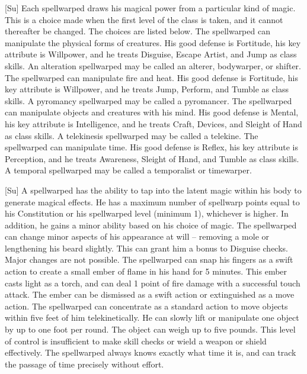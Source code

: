 [Su]
Each spellwarped draws his magical power from a particular kind of magic.
This is a choice made when the first level of the class is taken, and it cannot thereafter be changed.
The choices are listed below.
The spellwarped can manipulate the physical forms of creatures.
His good defense is Fortitude, his key attribute is Willpower, and he treats Disguise, Escape Artist, and Jump as class skills.
An alteration spellwarped may be called an alterer, bodywarper, or shifter.
The spellwarped can manipulate fire and heat.
His good defense is Fortitude, his key attribute is Willpower, and he treats Jump, Perform, and Tumble as class skills.
A pyromancy spellwarped may be called a pyromancer.
The spellwarped can manipulate objects and creatures with his mind.
His good defense is Mental, his key attribute is Intelligence, and he treats Craft, Devices, and Sleight of Hand as class skills.
A telekinesis spellwarped may be called a telekine.
The spellwarped can manipulate time.
His good defense is Reflex, his key attribute is Perception, and he treats Awareness, Sleight of Hand, and Tumble as class skills.
A temporal spellwarped may be called a temporalist or timewarper.

[Su]
A spellwarped has the ability to tap into the latent magic within his body to generate magical effects.
He has a maximum number of spellwarp points equal to his Constitution or his spellwarped level (minimum 1), whichever is higher.
In addition, he gains a minor ability based on his choice of magic.
The spellwarped can change minor aspects of his appearance at will -- removing a mole or lengthening his beard slightly.
This can grant him a  bonus to Disguise checks.
Major changes are not possible.
The spellwarped can snap his fingers as a swift action to create a small ember of flame in his hand for 5 minutes.
This ember casts light as a torch, and can deal 1 point of fire damage with a successful touch attack.
The ember can be dismissed as a swift action or extinguished as a move action.
The spellwarped can concentrate as a standard action to move objects within five feet of him telekinetically.
He can slowly lift or manipulate one object by up to one foot per round.
The object can weigh up to five pounds.
This level of control is insufficient to make skill checks or wield a weapon or shield effectively.
The spellwarped always knows exactly what time it is, and can track the passage of time precisely without effort.

